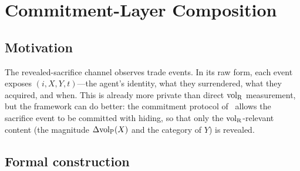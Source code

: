 \section{Commitment-Layer Composition}
\label{sec:commitment}

\subsection{Motivation}

The revealed-sacrifice channel observes trade events.  In its raw
form, each event exposes $(i, X, Y, t)$---the agent's identity,
what they surrendered, what they acquired, and when.  This is
already more private than direct ${\operatorname{vol}_{\mathrm{R}}}$ measurement, but the
framework can do better: the commitment protocol
of~\citep[Definition~6]{lasser2026exo} allows the sacrifice event
to be committed with hiding, so that only the ${\operatorname{vol}_{\mathrm{R}}}$-relevant
content (the magnitude $\Delta{\operatorname{vol}_{\mathrm{P}}}(X)$ and the category of $Y$)
is revealed.

\subsection{Formal construction}

